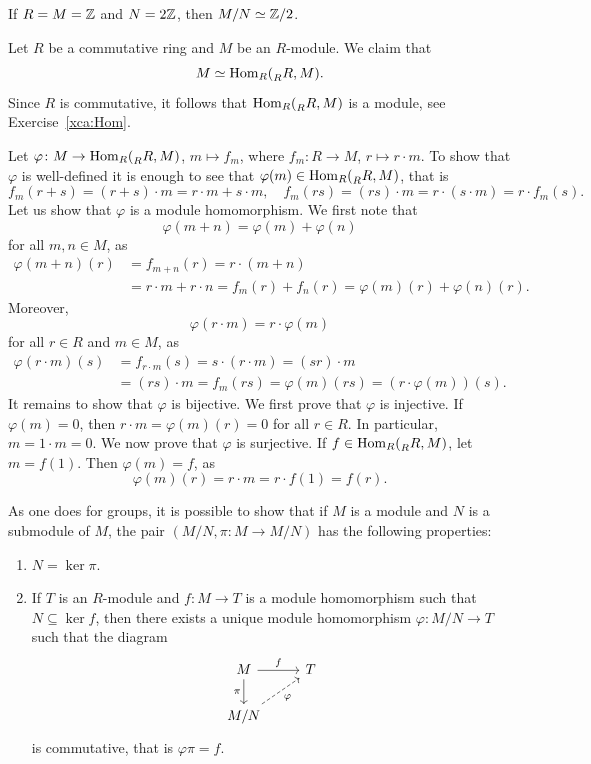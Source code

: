 \begin{example}
If $R=M=\mathbb{Z}$ and $N=2\mathbb{Z}$, then $M/N\simeq\mathbb{Z}/2$. 
\end{example}

\begin{example}
Let $R$ be a commutative ring and $M$ be an $R$-module. We claim that 
\[
M\simeq\operatorname{Hom}_R(\prescript{}{R}R,M).
\]
Since $R$ is commutative, it follows that $\operatorname{Hom}_R(\prescript{}{R}R,M)$ is a module, see Exercise~\ref{xca:Hom}.

Let $\varphi\colon M\to\operatorname{Hom}_R(\prescript{}{R}R,M)$, $m\mapsto f_m$, where $f_m\colon R\to M$, $r\mapsto r\cdot m$. 
To show that $\varphi$ is well-defined it is enough to see that $\varphi(m)\in\operatorname{Hom}_R(\prescript{}{R}R,M)$, that is 
\[
f_m(r+s)=(r+s)\cdot m=r\cdot m+s\cdot m,\quad
f_m(rs)=(rs)\cdot m=r\cdot (s\cdot m)=r\cdot f_m(s).
\]
Let us show that $\varphi$ is a module homomorphism. We first note that 
\[
\varphi(m+n)=\varphi(m)+\varphi(n)
\]
for all $m,n\in M$, as  
\begin{align*}
\varphi(m+n)(r)&=f_{m+n}(r)=r\cdot (m+n)\\
&=r\cdot m+r\cdot n=f_m(r)+f_n(r)=\varphi(m)(r)+\varphi(n)(r).
\end{align*}
Moreover, 
\[
\varphi(r\cdot m)=r\cdot\varphi(m)
\]
for all  
$r\in R$ and $m\in M$, as  
\begin{align*}
\varphi(r\cdot m)(s)&=f_{r\cdot m}(s)
=s\cdot (r\cdot m)
=(sr)\cdot m\\
&=(rs)\cdot m=f_m(rs)=\varphi(m)(rs)=(r\cdot\varphi(m))(s).
\end{align*}
It remains to show that $\varphi$ is bijective. We first prove that
$\varphi$ is injective. If $\varphi(m)=0$, then $r\cdot m=\varphi(m)(r)=0$ for all $r\in R$. In particular, 
$m=1\cdot m=0$. We now prove that $\varphi$ is surjective. If $f\in\operatorname{Hom}_R(\prescript{}{R}R,M)$, 
let $m=f(1)$. Then $\varphi(m)=f$, as
\[
\varphi(m)(r)=r\cdot m=r\cdot f(1)=f(r).
\]
\end{example}

As one does for groups, it is possible to show that if $M$ is a 
module and $N$ is a submodule of $M$, the pair 
$(M/N,\pi\colon M\to M/N)$ has the following properties:
\begin{enumerate}
\item $N=\ker \pi$.
\item If $T$ is an $R$-module and $f\colon M\to T$ is a module 
  homomorphism such that $N\subseteq \ker f$, then there exists a 
unique module homomorphism $\varphi\colon M/N\to T$ such that 
the diagram
\[
\begin{tikzcd}
	M & T \\
	{M/N}
	\arrow["\pi"', from=1-1, to=2-1]
	\arrow["f", from=1-1, to=1-2]
	\arrow["{\varphi }"', dashed, from=2-1, to=1-2]
\end{tikzcd}
\]
is commutative, that is 
$\varphi\pi =f$.  
\end{enumerate}

